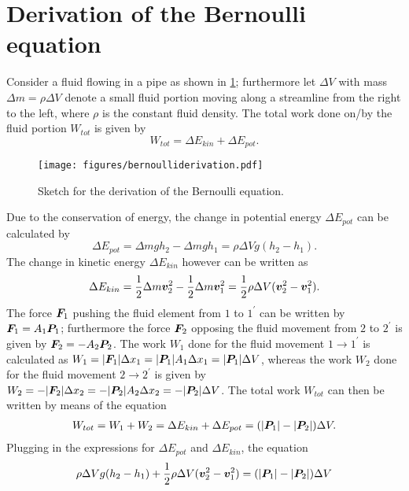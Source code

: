\documentclass[a4paper,11pt]{report}
\begin{document}
\section{Derivation of the Bernoulli equation}
Consider a fluid flowing in a pipe as shown in \cref{fig:bernoulliderivation}; furthermore let $\Delta V$ with mass $\Delta m = \rho\Delta V$ denote a small fluid portion moving along a streamline from the right to the left, where $\rho$ is the constant fluid density. The total work done on/by the fluid portion  $W_{tot}$ is given by \begin{equation}
W_{tot} = \Delta E_{kin} + \Delta E_{pot}.
\end{equation}
\begin{figure}[h]
\centering
\texttt{[image: figures/bernoulliderivation.pdf]}
\caption{Sketch for the derivation of the Bernoulli equation.}
\label{fig:bernoulliderivation}
\end{figure} Due to the conservation of energy, the change in potential energy $\Delta E_{pot}$ can be calculated by \begin{equation}
\Delta E_{pot} = \Delta m g h_2 - \Delta m g h_1 = \rho \Delta V g (h_2-h_1).
\end{equation} The change in kinetic energy $\Delta E_{kin}$ however can be written as \begin{equation}
\Delta E_{kin} = \frac{1}{2}\Delta m \bm{v}_2^2 - \frac{1}{2}\Delta m \bm{v}_1^2 = \frac{1}{2}\rho \Delta V (\bm{v}_2^2-\bm{v}_1^2).
\end{equation} The force $\bm{F}_1$ pushing the fluid element from $1$ to $1^\prime$ can be written by  $\bm{F}_1 = A_1\bm{P}_1$; furthermore the force $\bm{F}_2$ opposing the fluid movement from $2$ to $2^\prime$ is given by $\bm{F}_2 = -A_2 \bm{P}_2$. The work $W_1$ done for the fluid movement $1\rightarrow 1^\prime$ is calculated as $W_1 = |\bm{F}_1|\Delta x_1 = |\bm{P}_1|A_1\Delta x_1 = |\bm{P}_1|\Delta V$, whereas the work $W_2$ done for the fluid movement $2\rightarrow 2^\prime$ is given by $W_2 = -|\bm{F}_2|\Delta x_2 = -|\bm{P}_2|A_2\Delta x_2 = -|\bm{P}_2|\Delta V$. The total work $W_{tot}$ can then be written by means of the equation \begin{gather}
W_{tot} = W_1 + W_2 = \Delta E_{kin} + \Delta E_{pot} = (|\bm{P}_1|-|\bm{P}_2|)\Delta V.
\end{gather} Plugging in the expressions for $\Delta E_{pot}$ and $\Delta E_{kin}$, the equation \begin{equation}
\rho \Delta V g (h_2-h_1) + \frac{1}{2}\rho \Delta V (\vect{v}_2^2 - \vect{v}_1^2) = (|\vect{P}_1|-|\vect{P}_2|)\Delta V

\end{equation}
\end{document}

